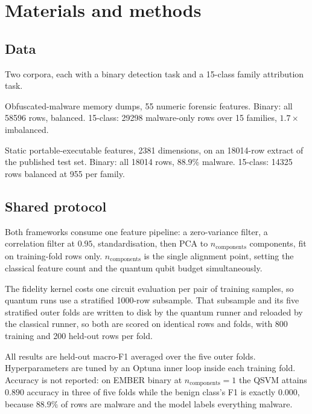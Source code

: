 \documentclass[11pt]{article}
\newcommand{\nc}{\ensuremath{n_{\mathrm{components}}}}
\begin{document}
\section{Materials and methods}
\label{sec:methods}

\subsection{Data}

Two corpora, each with a binary detection task and a 15-class family attribution
task.

\begin{description}[leftmargin=1.2em,style=nextline]
\item[CIC-MalMem-2022] Obfuscated-malware memory dumps, 55 numeric forensic
features. Binary: all \num{58596} rows, balanced. 15-class: \num{29298}
malware-only rows over 15 families, $1.7\times$ imbalanced.
\item[EMBER 2018] Static portable-executable features, 2381 dimensions, on an
\num{18014}-row extract of the published test set. Binary: all \num{18014} rows,
$88.9\%$ malware. 15-class: \num{14325} rows balanced at 955 per family.
\end{description}

\subsection{Shared protocol}

Both frameworks consume one feature pipeline: a zero-variance filter, a
correlation filter at $0.95$, standardisation, then PCA to \nc{} components, fit
on training-fold rows only. \nc{} is the single alignment point, setting the
classical feature count and the quantum qubit budget simultaneously.

The fidelity kernel costs one circuit evaluation per pair of training samples, so
quantum runs use a stratified 1000-row subsample. That subsample and its five
stratified outer folds are written to disk by the quantum runner and reloaded by
the classical runner, so both are scored on identical rows and folds, with 800
training and 200 held-out rows per fold.

All results are held-out macro-F1 averaged over the five outer folds.
Hyperparameters are tuned by an Optuna inner loop inside each training fold.
Accuracy is not reported: on EMBER binary at $\nc{}=1$ the QSVM attains $0.890$
accuracy in three of five folds while the benign class's F1 is exactly $0.000$,
because $88.9\%$ of rows are malware and the model labels everything malware.
\end{document}
